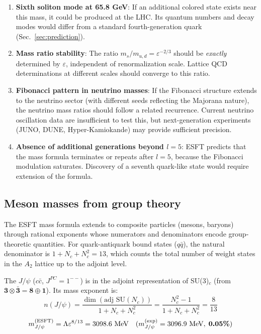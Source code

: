 ﻿\documentclass[twocolumn,preprintnumbers,amsmath,amssymb,prd]{revtex4-2}
\begin{document}
\begin{enumerate}
\item \textbf{Sixth soliton mode at 65.8 GeV}: If an additional colored state exists near this mass, it could be produced at the LHC. Its quantum numbers and decay modes would differ from a standard fourth-generation quark (Sec.~\ref{sec:prediction}).

\item \textbf{Mass ratio stability}: The ratio $m_s/m_{u,d} = \varepsilon^{-2/3}$ should be \emph{exactly} determined by $\varepsilon$, independent of renormalization scale. Lattice QCD determinations at different scales should converge to this ratio.

\item \textbf{Fibonacci pattern in neutrino masses}: If the Fibonacci structure extends to the neutrino sector (with different seeds reflecting the Majorana nature), the neutrino mass ratios should follow a related recurrence. Current neutrino oscillation data are insufficient to test this, but next-generation experiments (JUNO, DUNE, Hyper-Kamiokande) may provide sufficient precision.

\item \textbf{Absence of additional generations beyond $l=5$}: ESFT predicts that the mass formula terminates or repeats after $l=5$, because the Fibonacci modulation saturates. Discovery of a seventh quark-like state would require extension of the formula.
\end{enumerate}

\subsection{Meson masses from group theory}

The ESFT mass formula extends to composite particles (mesons, baryons) through rational exponents whose numerators and denominators encode group-theoretic quantities. For quark-antiquark bound states ($q\bar{q}$), the natural denominator is $1 + N_c + N_c^2 = 13$, which counts the total number of weight states in the $A_2$ lattice up to the adjoint level.

The $J/\psi$ ($c\bar{c}$, $J^{PC} = 1^{--}$) is in the adjoint representation of SU(3)$_c$ (from $\mathbf{3} \otimes \bar{\mathbf{3}} = \mathbf{8} \oplus \mathbf{1}$). Its mass exponent is:
\begin{equation}
n(J/\psi) = \frac{\dim(\text{adj SU}(N_c))}{1 + N_c + N_c^2} = \frac{N_c^2 - 1}{1 + N_c + N_c^2} = \frac{8}{13}
\end{equation}
\begin{equation}
m_{J/\psi}^{(\rm ESFT)} = \Lambda\varepsilon^{8/13} = 3098.6~\text{MeV} \quad (m_{J/\psi}^{(\rm exp)} = 3096.9~\text{MeV}, \; \textbf{0.05\%})
\end{equation}
\end{document}
